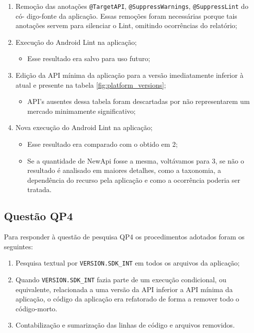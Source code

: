 \begin{enumerate}
	\item Remoção das anotações \texttt{@TargetAPI}, \texttt{@SuppressWarnings},
		 	\texttt{@SuppressLint} do có- digo-fonte da aplicação. Essas remoções foram
		 	 necessárias porque tais anotações servem para silenciar o Lint, omitindo 
		 	 ocorrências do relatório; 
	\item Execução do Android Lint na aplicação;
		\begin{itemize}
			\item Esse resultado era salvo para uso futuro;
		\end{itemize}
	\item Edição da API mínima da aplicação para a versão imediatamente inferior à atual
		e presente na tabela \ref{fig:platform_versions};
		\begin{itemize}
			\item API's ausentes dessa tabela foram descartadas por não representarem
			um mercado minimamente significativo;
		\end{itemize}
	\item Nova execução do Android Lint na aplicação;
		\begin{itemize}
			\item Esse resultado era comparado com o obtido em 2;
			\item Se a quantidade de NewApi fosse a mesma, voltávamos para 3, se não
			o resultado é analisado em maiores detalhes, como a taxonomia, a dependência
			do recurso pela aplicação e como a ocorrência poderia ser tratada.
		\end{itemize}
\end{enumerate}

\subsection{Questão QP4}
Para responder à questão de pesquisa QP4 os procedimentos adotados foram os seguintes:

\begin{enumerate}
	\item Pesquisa textual por \texttt{VERSION.SDK\_INT} em todos os arquivos da
		aplicação;
	\item Quando \texttt{VERSION.SDK\_INT} fazia parte de um execução condicional, ou equivalente, relacionada a uma versão da API inferior a API mínima da aplicação, o código da aplicação era refatorado de forma a remover todo o código-morto.
	\item Contabilização e sumarização das linhas de código e arquivos removidos.
\end{enumerate}

